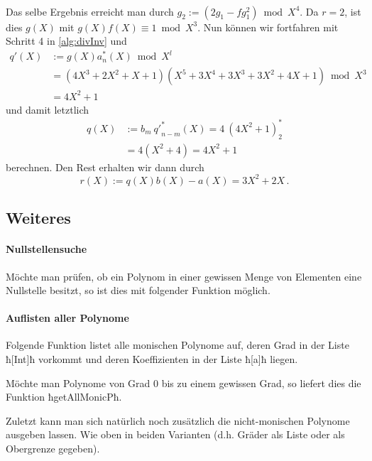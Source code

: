 \begin{beispiel}
\begin{tabular}{lrll}
  \end{tabular}\\
  Das selbe Ergebnis erreicht man durch $g_2 := (2g_1 - fg_1^2) \bmod X^4$.
  Da $r=2$, ist dies $g(X)$ mit $g(X)f(X) \equiv 1 \bmod X^3$.
  Nun können wir fortfahren mit Schritt 4 in \autoref{alg:divInv} und 
  \begin{align*}
    q'(X) &:= g(X) a^\ast_n(X) \bmod X^l\\
    &= (4X^3+2X^2+X+1)(X^5+3X^4+3X^3 + 3X^2 + 4X + 1) \bmod X^3\\
    &= 4X^2 + 1
  \end{align*}
  und damit letztlich
  \begin{align*}
    q(X) &:= b_m\ {q'}^\ast_{n-m}(X) = 4\ (4X^2+1)^\ast_{2} \\
    &= 4 (X^2 + 4) = 4X^2 + 1
  \end{align*}
  berechnen. Den Rest erhalten wir dann durch 
  \[ r(X) := q(X)b(X) - a(X) = 3X^2 + 2X\,. \]
\end{beispiel}

\subsection{Weiteres}

\paragraph{Nullstellensuche} Möchte man prüfen, ob ein Polynom in einer
gewissen Menge von Elementen eine Nullstelle besitzt, so ist dies mit folgender
Funktion möglich.


\paragraph{Auflisten aller Polynome} 
Folgende Funktion listet alle monischen Polynome auf, deren Grad in der Liste
ħ[Int]ħ vorkommt und deren Koeffizienten in der Liste ħ[a]ħ liegen.


Möchte man Polynome von Grad $0$ bis zu einem gewissen Grad, so liefert dies
die Funktion ħgetAllMonicPħ.


Zuletzt kann man sich natürlich noch zusätzlich die nicht-monischen Polynome
ausgeben lassen. Wie oben in beiden Varianten (d.h. Gräder als Liste oder als
Obergrenze gegeben).


